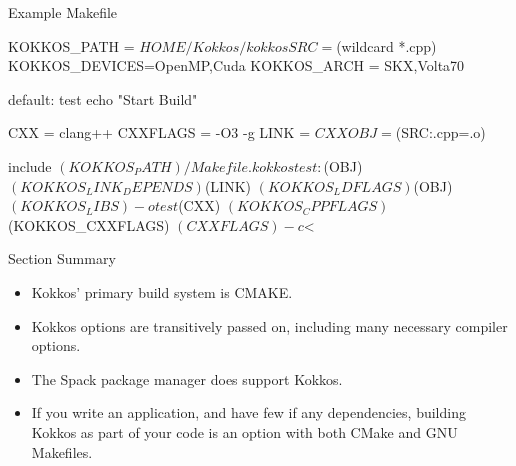 \begin{frame}[fragile]{Example Makefile}
\begin{tiny}
\begin{shell}
KOKKOS_PATH = ${HOME}/Kokkos/kokkos
SRC = $(wildcard *.cpp)
KOKKOS_DEVICES=OpenMP,Cuda
KOKKOS_ARCH = SKX,Volta70

default: test
  echo "Start Build"

CXX = clang++
CXXFLAGS = -O3 -g
LINK = ${CXX}

OBJ = $(SRC:.cpp=.o)

include $(KOKKOS_PATH)/Makefile.kokkos

test: $(OBJ) $(KOKKOS_LINK_DEPENDS)
  $(LINK) $(KOKKOS_LDFLAGS) $(OBJ) $(KOKKOS_LIBS) -o test

  $(CXX) $(KOKKOS_CPPFLAGS) $(KOKKOS_CXXFLAGS) $(CXXFLAGS)  -c $<
\end{shell}
\end{tiny}
\end{frame}


\begin{frame}{Section Summary}

  \begin{itemize}
    \item{Kokkos' primary build system is CMAKE.}
    \item{Kokkos options are transitively passed on, including many necessary compiler options.}
    \item{The Spack package manager does support Kokkos.}
    \item{If you write an application, and have few if any dependencies, building Kokkos as part of your code is an option with both CMake and GNU Makefiles.}
  \end{itemize}

\end{frame}
